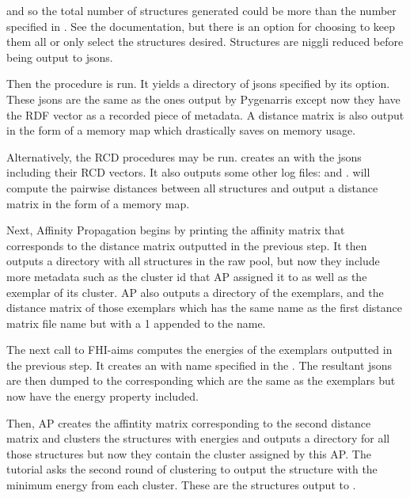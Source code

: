 \documentclass[letterpaper,10pt,english]{sphinxmanual}
\begin{document}
and so the total number of structures generated could
be more than the number specified in . See the documentation, but
there is an option for choosing to keep them all or only select
the  structures desired. Structures are niggli reduced
before being output to jsons.

Then the  procedure is run. It yields a directory of jsons
specified by its  option. These jsons are the same as the
ones output by Pygenarris except now they have the RDF vector as a recorded
piece of metadata. A distance matrix is also output in the form
of a memory map which drastically saves on memory usage.

Alternatively, the RCD procedures may be run.  creates an
 with the jsons including their RCD vectors. It also
outputs some other log files:  and .
 will compute the pairwise distances between all
structures and output a distance matrix in the form of a memory map.

Next, Affinity Propagation begins by printing the affinity matrix that
corresponds to the distance matrix outputted in the previous step.
It then outputs a directory with all structures in the raw pool, but now they
include more metadata such as the cluster id that AP assigned
it to as well as the exemplar of its cluster. AP also outputs a directory of
the exemplars, and the distance matrix of those exemplars which has
the same name as the first distance matrix file name but with a 1 appended
to the name.

The next call to FHI-aims computes the energies of the exemplars outputted in
the previous step. It creates an  with name specified in
the . The resultant jsons are then dumped to the corresponding
 which are the same as the exemplars but now have the energy
property included.

Then, AP creates the affintity matrix corresponding to the second distance
matrix and clusters the structures with energies and outputs a directory
for all those structures but now they contain the cluster assigned by this AP.
The tutorial asks the second round of clustering to output the
structure with the minimum energy from each cluster. These are the structures
output to .
\end{document}
